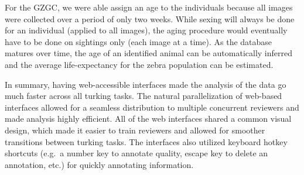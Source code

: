 For the GZGC, we were able assign an age to the individuals because all images were collected over a period of only two weeks.  While sexing will always be done for an individual (applied to all images), the aging procedure would eventually have to be done on sightings only (each image at a time).  As the database matures over time, the age of an identified animal can be automatically inferred and the average life-expectancy for the zebra population can be estimated.

In summary, having web-accessible interfaces made the analysis of the data go much faster across all turking tasks.  The natural parallelization of web-based interfaces allowed for a seamless distribution to multiple concurrent reviewers and made analysis highly efficient.  All of the web interfaces shared a common visual design, which made it easier to train reviewers and allowed for smoother transitions between turking tasks.  The interfaces also utilized keyboard hotkey shortcuts (e.g.\ a number key to annotate quality, escape key to delete an annotation, etc.) for quickly annotating information.
